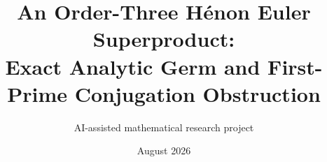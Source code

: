 \documentclass[11pt]{article}
\title{An Order-Three H\'enon Euler Superproduct:\\
Exact Analytic Germ and First-Prime Conjugation Obstruction}
\author{AI-assisted mathematical research project}
\date{August 2026}
\begin{document}
\maketitle
\begin{abstract}

\end{abstract}









\appendix

\end{document}
